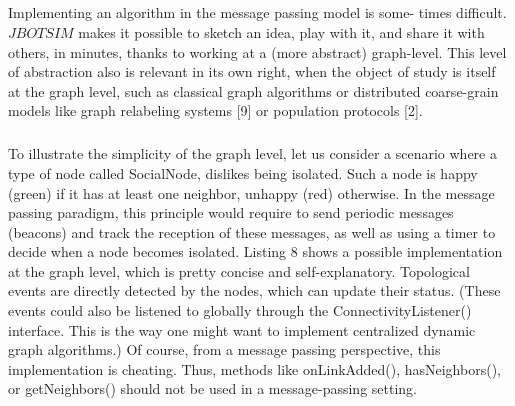 \subparagraph{}Implementing an algorithm in the message passing model is some- times difficult. $JBOTSIM$ makes it possible to sketch an idea, play with it, and share it with others, in minutes, thanks to working at a (more abstract) graph-level. This level of abstraction also is relevant in its own right, when the object of study is itself at the graph level, such as classical graph algorithms or distributed coarse-grain models like graph relabeling systems [9] or population protocols [2].
\subparagraph{}To illustrate the simplicity of the graph level, let us consider a scenario where a type of node called SocialNode, dislikes being isolated. Such a node is happy (green) if it has at least one neighbor, unhappy (red) otherwise. In the message passing paradigm, this principle would require to send periodic messages (beacons) and track the reception of these messages, as well as using a timer to decide when a node becomes isolated. Listing 8 shows a possible implementation at the graph level, which is pretty concise and self-explanatory. Topological events are directly detected by the nodes, which can update their status. (These events could also be listened to globally through the ConnectivityListener() interface. This is the way one might want to implement centralized dynamic graph algorithms.) Of course, from a message passing perspective, this implementation is cheating. Thus, methods like onLinkAdded(), hasNeighbors(), or getNeighbors() should not be used in a message-passing setting.


